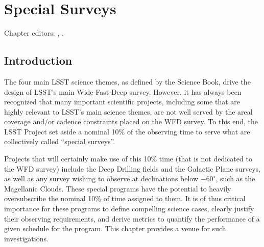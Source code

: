 \chapter[Special Surveys]{Special Surveys}
\def\chpname{specialsurveys}\label{chp:\chpname}

Chapter editors:
,
.



%


\section{Introduction}
\label{sec:specials:intro}

The four main LSST science themes, as defined by the Science Book,
drive the design of LSST's main Wide-Fast-Deep survey.  However, it
has always been recognized that many important scientific projects,
including some that are highly relevant to LSST's main science themes,
are not well served by the areal coverage and/or cadence constraints
placed on the WFD survey.  To this end, the LSST Project set aside a
nominal 10\% of the observing time to serve what are collectively
called ``special surveys''.

Projects that
will certainly make use of this 10\% time (that is not dedicated to the WFD
survey) include the Deep Drilling fields and the Galactic Plane surveys,
as well as any survey wishing to
observe at declinations below $-60^\circ$, such as the Magellanic
Clouds.  These special programs have the potential to
heavily oversubscribe the nominal 10\%
of time assigned to them.  It is of thus critical importance for these
programs to define compelling science cases, clearly justify their
observing requirements, and derive metrics to quantify the performance
of a given schedule for the program. This chapter provides a venue for
such investigations.

